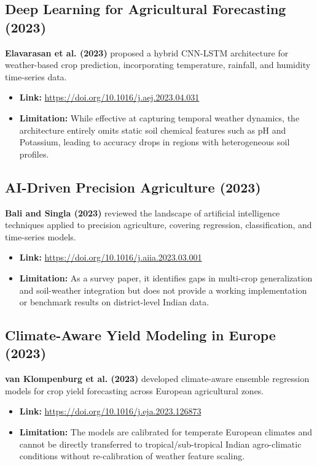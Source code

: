 \documentclass[11pt,a4paper]{article}
\begin{document}
\subsection{Deep Learning for Agricultural Forecasting (2023)}
\textbf{Elavarasan et al. (2023)} \cite{elavarasan2023deep} proposed a hybrid CNN-LSTM architecture for weather-based crop prediction, incorporating temperature, rainfall, and humidity time-series data.
\begin{itemize}
    \item \textbf{Link:} \url{https://doi.org/10.1016/j.aej.2023.04.031}
    \item \textbf{Limitation:} While effective at capturing temporal weather dynamics, the architecture entirely omits static soil chemical features such as pH and Potassium, leading to accuracy drops in regions with heterogeneous soil profiles.
\end{itemize}

\subsection{AI-Driven Precision Agriculture (2023)}
\textbf{Bali and Singla (2023)} \cite{bali2023aidriven} reviewed the landscape of artificial intelligence techniques applied to precision agriculture, covering regression, classification, and time-series models.
\begin{itemize}
    \item \textbf{Link:} \url{https://doi.org/10.1016/j.aiia.2023.03.001}
    \item \textbf{Limitation:} As a survey paper, it identifies gaps in multi-crop generalization and soil-weather integration but does not provide a working implementation or benchmark results on district-level Indian data.
\end{itemize}

\subsection{Climate-Aware Yield Modeling in Europe (2023)}
\textbf{van Klompenburg et al. (2023)} \cite{vanklompenburg2023climate} developed climate-aware ensemble regression models for crop yield forecasting across European agricultural zones.
\begin{itemize}
    \item \textbf{Link:} \url{https://doi.org/10.1016/j.eja.2023.126873}
    \item \textbf{Limitation:} The models are calibrated for temperate European climates and cannot be directly transferred to tropical/sub-tropical Indian agro-climatic conditions without re-calibration of weather feature scaling.
\end{itemize}
\end{document}
